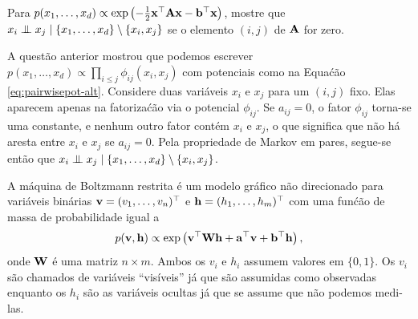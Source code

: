 \begin{exenumerate}
\begin{solution}
    \end{solution}
    
    \item Para $p(x_1, \ldots, x_d) \propto \exp\left( -\frac{1}{2} \mathbf{x}^\top
    \mathbf{A} \mathbf{x} - \mathbf{b}^\top \mathbf{x} \right)$, mostre que $x_i \mathrel{\perp\mspace{-10mu}\perp} x_j \mid
    \{x_1, \ldots, x_d\} \setminus \{x_i,x_j\}$ se o elemento $(i,j)$
    de $\mathbf{A}$ for zero.
    
    \begin{solution}
        
        A quest\~ao anterior mostrou que podemos escrever $p(x_1, \ldots,
        x_d) \propto \prod_{i \leq j} \phi_{ij}(x_i,x_j)$ com potenciais como na
        Equa\'c\~ao \eqref{eq:pairwisepot-alt}. Considere duas vari\'aveis $x_i$ e
        $x_j$ para um $(i,j)$ fixo. Elas aparecem apenas na fatoriza\'c\~ao via
        o potencial $\phi_{ij}$. Se $a_{ij} = 0$, o fator $\phi_{ij}$
        torna-se uma constante, e nenhum outro fator cont\'em $x_i$ e $x_j$,
        o que significa que n\~ao h\'a aresta entre $x_i$ e $x_j$ se
        $a_{ij}=0$. Pela propriedade de Markov em pares, segue-se ent\~ao que
        $x_i \mathrel{\perp\mspace{-10mu}\perp} x_j \mid \{x_1, \ldots, x_d\} \setminus \{x_i,x_j\}$.
        
    \end{solution}
    
\end{exenumerate}



%
A m\'aquina de Boltzmann restrita \'e um modelo gr\'afico n\~ao direcionado
para vari\'aveis bin\'arias $\mathbf{v} =(v_1, \ldots, v_n)^\top$ e
$\mathbf{h}=(h_1, \ldots, h_m)^\top$ com uma fun\'c\~ao de massa de probabilidade igual a
\begin{equation}
    p(\mathbf{v},\mathbf{h}) \propto \exp\left( \mathbf{v}^\top \mathbf{W} \mathbf{h} + \mathbf{a}^\top\mathbf{v} + \mathbf{b}^\top\mathbf{h} \right),
\end{equation}
onde $\mathbf{W}$ \'e uma matriz $n \times m$. Ambos os $v_i$ e $h_i$ assumem valores em $\{0,1\}$. Os
$v_i$ s\~ao chamados de vari\'aveis ``vis\'iveis'' j\'a que s\~ao assumidas como
observadas enquanto os $h_i$ s\~ao as vari\'aveis ocultas j\'a que se assume que n\~ao podemos medi-las.

